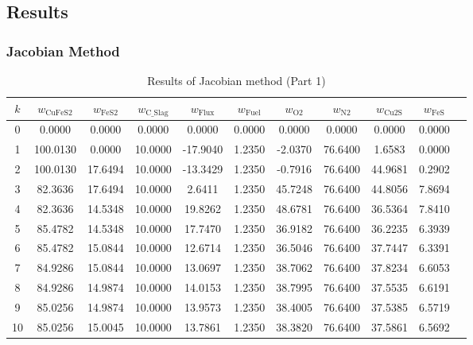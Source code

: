 \documentclass[10pt]{article}
\begin{document}
\subsection{Results}

\subsubsection{Jacobian Method}

\begin{table}[H]
\centering
\caption{Results of Jacobian method (Part 1)}
\begin{tabular}{ccccccccccc}
\toprule
\( k \) & \( w_{\text{CuFeS2}} \) & \( w_{\text{FeS2}} \) & \( w_{\text{C\_Slag}} \) & \( w_{\text{Flux}} \) & \( w_{\text{Fuel}} \) & \( w_{\text{O2}} \) & \( w_{\text{N2}} \) & \( w_{\text{Cu2S}} \) & \( w_{\text{FeS}} \)\\
\midrule
0 & 0.0000 & 0.0000 & 0.0000 & 0.0000 & 0.0000 & 0.0000 & 0.0000 & 0.0000 & 0.0000 \\
1 & 100.0130 & 0.0000 & 10.0000 & -17.9040 & 1.2350 & -2.0370 & 76.6400 & 1.6583 & 0.0000 \\
2 & 100.0130 & 17.6494 & 10.0000 & -13.3429 & 1.2350 & -0.7916 & 76.6400 & 44.9681 & 0.2902\\
3 & 82.3636 & 17.6494 & 10.0000 & 2.6411 & 1.2350 & 45.7248 & 76.6400 & 44.8056 & 7.8694 \\
4 & 82.3636 & 14.5348 & 10.0000 & 19.8262 & 1.2350 & 48.6781 & 76.6400 & 36.5364 & 7.8410 \\
5 & 85.4782 & 14.5348 & 10.0000 & 17.7470 & 1.2350 & 36.9182 & 76.6400 & 36.2235 & 6.3939 \\
6 & 85.4782 & 15.0844 & 10.0000 & 12.6714 & 1.2350 & 36.5046 & 76.6400 & 37.7447 & 6.3391 \\
7 & 84.9286 & 15.0844 & 10.0000 & 13.0697 & 1.2350 & 38.7062 & 76.6400 & 37.8234 & 6.6053 \\
8 & 84.9286 & 14.9874 & 10.0000 & 14.0153 & 1.2350 & 38.7995 & 76.6400 & 37.5535 & 6.6191 \\
9 & 85.0256 & 14.9874 & 10.0000 & 13.9573 & 1.2350 & 38.4005 & 76.6400 & 37.5385 & 6.5719 \\
10 & 85.0256 & 15.0045 & 10.0000 & 13.7861 & 1.2350 & 38.3820 & 76.6400 & 37.5861 & 6.5692 \\
\bottomrule
\end{tabular}
\end{table}
\end{document}

